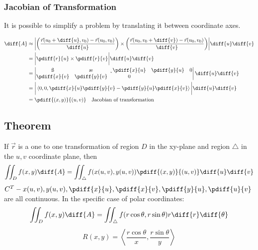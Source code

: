 \documentclass[letterpaper, 12pt]{math}
\begin{document}
\subsubsection*{Jacobian of Transformation}
It is possible to simplify a problem by translating it between coordinate axes.
\begin{center}
\end{center}
\begin{align*}
  \diff{A} &\approx \bigg|
    \bigg(\frac{\vec{r}(u_0+\diff{u},v_0)-\vec{r}(u_0,v_0)}{\diff{u}}\bigg)
    \times
    \bigg(\frac{\vec{r}(u_0,v_0+\diff{v})-\vec{r}(u_0,v_0)}{\diff{v}}\bigg)
    \bigg| \diff{u}\diff{v} \\
  &= \bigg|\pdiff{r}{u}\times\pdiff{r}{v}\bigg|\diff{u}\diff{v} \\
  &= \begin{vmatrix}
    \i & \j & \k \\
    \pdiff{x}{u} & \pdiff{y}{u} & 0 \\
    \pdiff{x}{v} & \pdiff{y}{v} & 0
  \end{vmatrix}\diff{u}\diff{v} \\
  &= \bigg|\left\langle
    0,0,\pdiff{x}{u}\pdiff{y}{v}-\pdiff{y}{u}\pdiff{x}{v}\right\rangle\bigg|
    \diff{u}\diff{v} \\
  &= \pdiff{(x,y)}{(u,v)} \quad \text{Jacobian of transformation}
\end{align*}

\subsection*{Theorem}
If \( \vec{r} \) is a one to one transformation of region \( D \) in the
xy-plane and region \( \triangle \) in the \( u,v \) coordinate plane, then
\[ \iint_{D}f(x,y)\diff{A} =
  \iint_{\triangle}f(x(u,v),y(u,v))\pdiff{(x,y)}{(u,v)}\diff{u}\diff{v} \]
\( C^T - x(u,v),y(u,v),\pdiff{x}{u},\pdiff{x}{v},\pdiff{y}{u},\pdiff{u}{v} \)
are all continuous. In the specific case of polar coordinates:
\[ \iint_{D}f(x,y)\diff{A} =
  \iint_{\triangle}f(r\cos\theta,r\sin\theta)r\diff{r}\diff{\theta} \]
\[ R(x,y) = \left\langle
  \frac{r\cos\theta}{x},\frac{r\sin\theta}{y}\right\rangle \]
\end{document}
